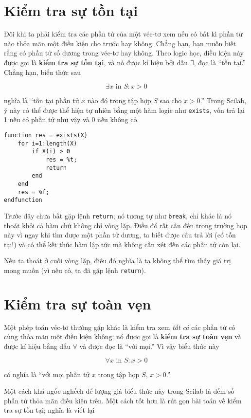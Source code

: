 \documentclass[12pt]{book}
\begin{document}
\section{Kiểm tra sự tồn tại}

Đôi khi ta phải kiểm tra các phần tử của một véc-tơ xem nếu có
bất kì phần tử nào thỏa mãn một điều kiện cho trước hay không.
Chẳng hạn, bạn muốn biết rằng có phần tử số dương trong véc-tơ
hay không. Theo logic học, điều kiện này được gọi là 
{\bf kiểm tra sự tồn tại}, và nó được kí hiệu bởi dấu $\exists$, 
đọc là ``tồn tại.''  Chẳng hạn, biểu thức sau

\[ \exists x \mbox{~in~} S: x>0 \]

\noindent nghĩa là ``tồn tại phần tử $x$ nào đó trong tập hợp $S$ sao cho
$x>0$.''  Trong Scilab, ý này có thể được thể hiện tự nhiên bằng
một hàm logic như {\tt exists}, vốn trả lại 1 nếu có phần tử như vậy
và 0 nếu không có.

\begin{verbatim}
function res = exists(X)
    for i=1:length(X)
        if X(i) > 0
            res = %t;
            return
        end
    end
    res = %f;
endfunction
\end{verbatim}
%
Trước đây chưa bắt gặp lệnh {\tt return}; nó tương tự như 
{\tt break}, chỉ khác là nó thoát khỏi cả hàm chứ không chỉ vòng lặp.
Điều đó rất cần đến trong trường hợp này vì ngay khi tìm được một
phần tử dương, ta biết được câu trả lời (có tồn tại!) và có thể
kết thúc hàm lập tức mà không cần xét đến các phần tử còn lại.

Nếu ta thoát ở cuối vòng lặp, điều đó nghĩa là ta không thể tìm
thấy giá trị mong muốn (vì nếu có, ta đã gặp lệnh {\tt return}).



\section{Kiểm tra sự toàn vẹn}

Một phép toán véc-tơ thường gặp khác là kiểm tra xem {\em tất cả}
các phần tử có cùng thỏa mãn một điều kiện không; nó được gọi là
{\bf kiểm tra sự toàn vẹn} và được kí hiệu bằng dấu $\forall$ và
được đọc là ``với mọi.''  Vì vậy biểu thức này

\[ \forall x \mbox{~in~} S: x>0 \]

\noindent có nghĩa là ``với mọi phần tử $x$ trong tập hợp $S$, $x>0$.''

Một cách khá ngốc nghếch để lượng giá biểu thức này trong Scilab
là đếm số phần tử thỏa mãn điều kiện trên. Một cách tốt hơn là
rút gọn bài toán về kiểm tra sự tồn tại; nghĩa là viết lại
\end{document}
